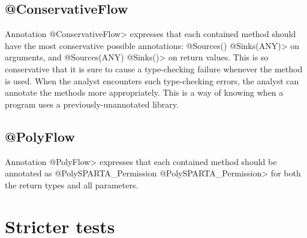 \subsection{@ConservativeFlow}

Annotation \<@ConservativeFlow> expresses that each contained method
should have the most conservative possible annotations:
  \<@Sources({}) @Sinks(ANY)> on arguments, and
  \<@Sources(ANY) @Sinks({})> on return values.
This is so conservative that it is sure to cause a type-checking failure
whenever the method is used.
When the analyst encounters such type-checking errors, the analyst can
annotate the methods more appropriately.  This is a way of knowing when a
program uses a previously-unannotated library.


\subsection{@PolyFlow\label{sec:polyflow}}

Annotation \<@PolyFlow> expresses that each contained method should be
annotated as \<@PolySPARTA\_Permission @PolySPARTA\_Permission> for both the return
types and all parameters.



%
%
%




\section{Stricter tests\label{sec:stricter}}

